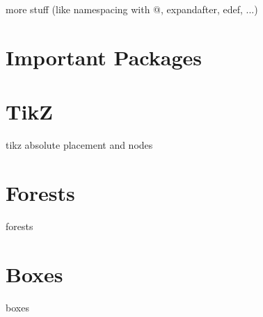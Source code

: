 \begin{frame}
   more stuff (like namespacing with @, expandafter, edef, ...)
\end{frame}

\section[Packages]{Important Packages}
\begin{frame}{\insertsection}

\end{frame}

\section{TikZ}

\begin{frame}{\insertsection}
   tikz absolute placement and nodes
\end{frame}

\section{Forests}
\begin{frame}{\insertsection}
   forests
\end{frame}

\section{Boxes}
\begin{frame}{\insertsection}
   boxes
\end{frame}



